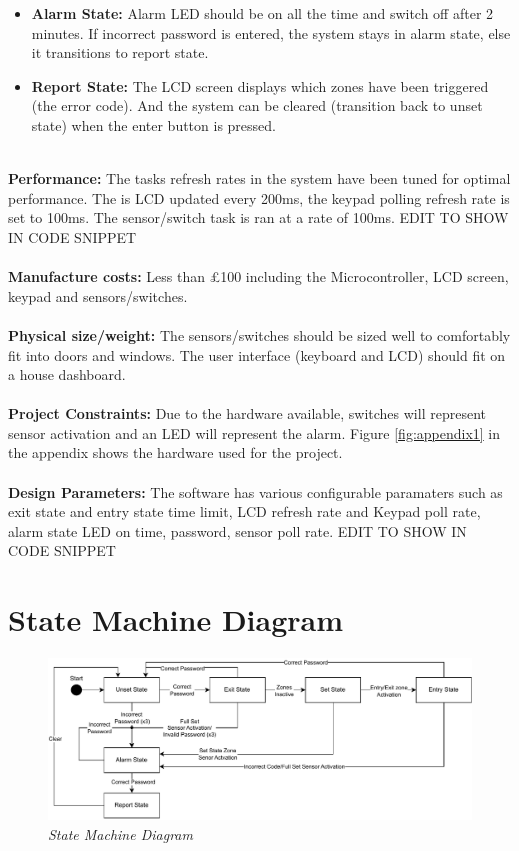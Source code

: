 \documentclass[aps, secnumarabic, balancelastpage, asmath, amssymb, nofootinbib, floatfix,]{revtex4-2}
\begin{document}
{{\begin{itemize}
\item \textbf{Alarm State: }Alarm LED should be on all the time and switch off after 2 minutes. If incorrect password is entered, the system stays in alarm state, else it transitions to report state.
\item \textbf{Report State: }The LCD screen displays which zones have been triggered (the error code). And the system can be cleared (transition back to unset state) when the enter button is pressed.
\end{itemize}
~\\
{\bf Performance: }The tasks refresh rates in the system have been tuned for optimal performance. The is LCD updated every 200ms, the keypad polling refresh rate is set to 100ms. The sensor/switch task is ran at a rate of 100ms. EDIT TO SHOW IN CODE SNIPPET
~\\
~\\
{\bf Manufacture costs: }Less than £100 including the Microcontroller, LCD screen, keypad and sensors/switches.
~\\
~\\
{\bf Physical size/weight: }The sensors/switches should be sized well to comfortably fit into doors and windows. The user interface (keyboard and LCD) should fit on a house dashboard.
~\\
~\\
{\bf Project Constraints: }Due to the hardware available, switches will represent sensor activation and an LED will represent the alarm. Figure \ref{fig:appendix1} in the appendix shows the hardware used for the project.
~\\
~\\
{\bf Design Parameters: }The software has various configurable paramaters such as exit state and entry state time limit, LCD refresh rate and Keypad poll rate, alarm state LED on time, password, sensor poll rate. EDIT TO SHOW IN CODE SNIPPET


}

\clearpage

\section{\fontsize{11.3pt}{12pt}\selectfont \bf State Machine Diagram}
\fontsize{11pt}{12pt}\selectfont
\label{sec:2}

\begin{figure}[h]
  \centering
  \includegraphics[scale = 0.85]{ce323-state-diagram.pdf}
  \caption{\em State Machine Diagram}
  \label{fig:image1}
\end{figure}

}
\end{document}
